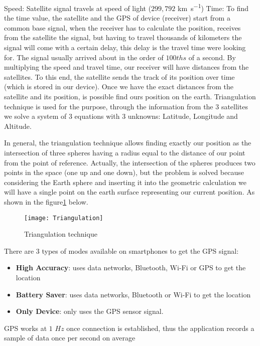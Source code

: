 \documentclass[tesi]{subfiles}
\begin{document}
Speed: Satellite signal travels at speed of light ($299,792$ \si{\km\per\second})
Time: To find the time value, the satellite and the GPS of device (receiver) start from a common base signal, when the receiver has to calculate the position, receives from the satellite the signal, but having to travel thousands of kilometers the signal will come with a certain delay, this delay is the travel time were looking for. The signal usually arrived about in the order of $100ths$ of a second.
By multiplying the speed and travel time, our receiver will have distances from the satellites. To this end, the satellite sends the track of its position over time (which is stored in our device). Once we have the exact distances from the satellite and its position, is possible find ours position on the earth. Triangulation technique is used for the purpose, through the information from the 3 satellites we solve a system of 3 equations with 3 unknowns: Latitude, Longitude and Altitude.

In general, the triangulation technique allows finding exactly our position as the intersection of three spheres having a radius equal to the distance of our point from the point of reference. Actually, the intersection of the spheres produces two points in the space (one up and one down), but the problem is solved because considering the Earth sphere and inserting it into the geometric calculation we will have a single point on the earth surface representing our current position. As shown in the figure\ref{fig:Triangulation technique} below.

\begin{figure}[H]
\centering
\texttt{[image: Triangulation]}
\caption{Triangulation technique}
\label{fig:Triangulation technique}
\end{figure}
\vspace{0.5cm}

There are 3 types of modes available on smartphones to get the GPS signal: 
\begin{itemize}
\item \textbf{High Accuracy}: uses data networks, Bluetooth, Wi-Fi or GPS to get the location
\item \textbf{Battery Saver}: uses data networks, Bluetooth or Wi-Fi to get the location
\item \textbf{Only Device}:  only uses the GPS sensor signal.
\end{itemize}

GPS works at $1$ $Hz$ once connection is established, thus the application records a sample of data once per second on average
\end{document}

